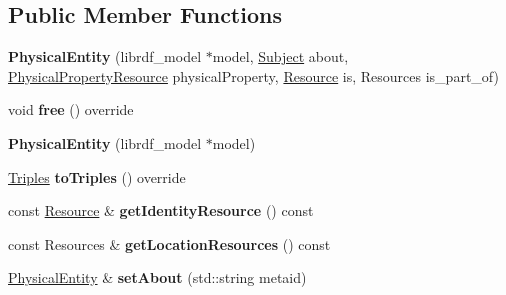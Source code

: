 \subsection*{Public Member Functions}
\begin{DoxyCompactItemize}
\item 
\mbox{\label{classsemsim_1_1PhysicalEntity_a38bf3915fbd86b2adb9e9779301a94b3}} 
{\bfseries Physical\+Entity} (librdf\+\_\+model $\ast$model, \hyperlink{classsemsim_1_1Subject}{Subject} about, \hyperlink{classsemsim_1_1PhysicalPropertyResource}{Physical\+Property\+Resource} physical\+Property, \hyperlink{classsemsim_1_1Resource}{Resource} is, Resources is\+\_\+part\+\_\+of)
\item 
\mbox{\label{classsemsim_1_1PhysicalEntity_a3978fc7ce8633d583965a858ee99a418}} 
void {\bfseries free} () override
\item 
\mbox{\label{classsemsim_1_1PhysicalEntity_a1df028fe0ee3f7f58e2eb7ea28d118ec}} 
{\bfseries Physical\+Entity} (librdf\+\_\+model $\ast$model)
\item 
\mbox{\label{classsemsim_1_1PhysicalEntity_a32f4240e1ab47f422e704f97c669e824}} 
\hyperlink{classsemsim_1_1Triples}{Triples} {\bfseries to\+Triples} () override
\item 
\mbox{\label{classsemsim_1_1PhysicalEntity_a5940a4984dbd8fb6cef55de5cd36a9b4}} 
const \hyperlink{classsemsim_1_1Resource}{Resource} \& {\bfseries get\+Identity\+Resource} () const
\item 
\mbox{\label{classsemsim_1_1PhysicalEntity_aa2aeec22fc0f703b2e83fcfd59b25f29}} 
const Resources \& {\bfseries get\+Location\+Resources} () const
\item 
\mbox{\label{classsemsim_1_1PhysicalEntity_aa5b88988a264a59b174452ec49f824ba}} 
\hyperlink{classsemsim_1_1PhysicalEntity}{Physical\+Entity} \& {\bfseries set\+About} (std\+::string metaid)
\item 
\mbox{\label{classsemsim_1_1PhysicalEntity_ae2408ca531d0755ff28ad1e4f062023d}} 

\end{DoxyCompactItemize}
